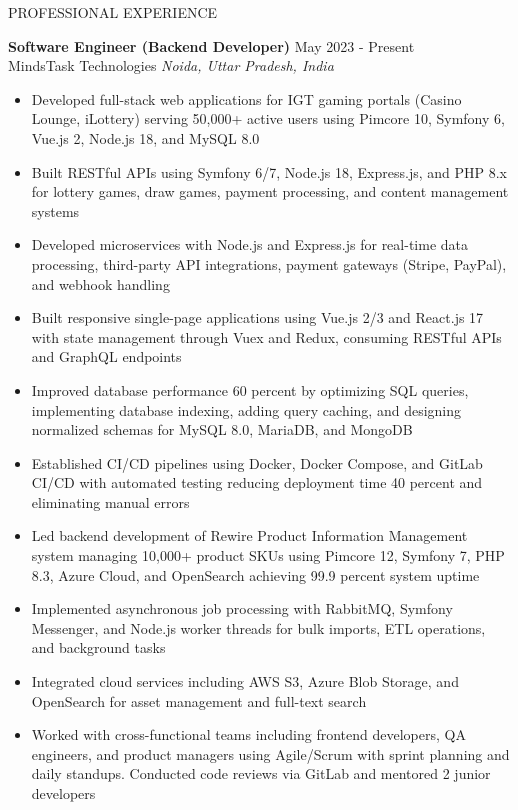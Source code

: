 \documentclass{resume} %
\begin{document}

\begin{rSection}{PROFESSIONAL EXPERIENCE}

\textbf{Software Engineer (Backend Developer)} \hfill May 2023 - Present\\
MindsTask Technologies \hfill \textit{Noida, Uttar Pradesh, India}
\begin{itemize}
    \itemsep -3pt {}
    \item Developed full-stack web applications for IGT gaming portals (Casino Lounge, iLottery) serving 50,000+ active users using Pimcore 10, Symfony 6, Vue.js 2, Node.js 18, and MySQL 8.0
    \item Built RESTful APIs using Symfony 6/7, Node.js 18, Express.js, and PHP 8.x for lottery games, draw games, payment processing, and content management systems
    \item Developed microservices with Node.js and Express.js for real-time data processing, third-party API integrations, payment gateways (Stripe, PayPal), and webhook handling
    \item Built responsive single-page applications using Vue.js 2/3 and React.js 17 with state management through Vuex and Redux, consuming RESTful APIs and GraphQL endpoints
    \item Improved database performance 60 percent by optimizing SQL queries, implementing database indexing, adding query caching, and designing normalized schemas for MySQL 8.0, MariaDB, and MongoDB
    \item Established CI/CD pipelines using Docker, Docker Compose, and GitLab CI/CD with automated testing reducing deployment time 40 percent and eliminating manual errors
    \item Led backend development of Rewire Product Information Management system managing 10,000+ product SKUs using Pimcore 12, Symfony 7, PHP 8.3, Azure Cloud, and OpenSearch achieving 99.9 percent system uptime
    \item Implemented asynchronous job processing with RabbitMQ, Symfony Messenger, and Node.js worker threads for bulk imports, ETL operations, and background tasks
    \item Integrated cloud services including AWS S3, Azure Blob Storage, and OpenSearch for asset management and full-text search
    \item Worked with cross-functional teams including frontend developers, QA engineers, and product managers using Agile/Scrum with sprint planning and daily standups. Conducted code reviews via GitLab and mentored 2 junior developers
\end{itemize}

\end{rSection}
\end{document}
